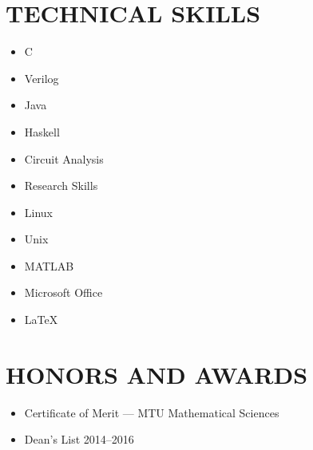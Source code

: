\documentclass[letterpaper]{res}
\begin{document}
\begin{resume}
  \section{TECHNICAL SKILLS}
  \vspace{-1pt}
  \begin{multicols}{4}
    \begin{itemize} \itemsep1pt \parskip0pt 
      \item C
      \item Verilog
      \item Java
      \item Haskell
      \item Circuit Analysis
      \item Research Skills
      \item Linux
      \item Unix
      \item MATLAB
      \item Microsoft Office
      \item LaTeX
    \end{itemize}
  \end{multicols}

  \section{HONORS AND AWARDS}
  \begin{itemize}
    \item Certificate of Merit --- MTU Mathematical Sciences
    \item Dean's List 2014--2016
  \end{itemize}

\end{resume}
\end{document}
